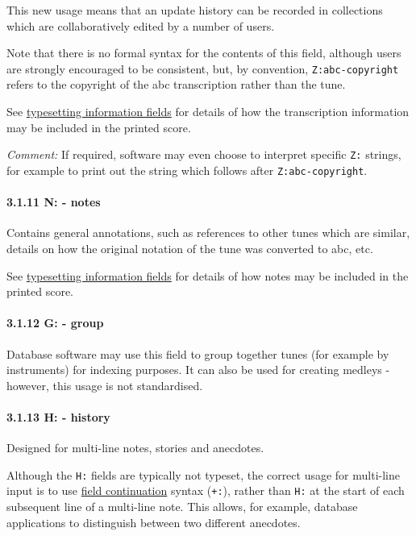 \documentclass[oneside]{book}
\let\oldparagraph\paragraph
\renewcommand{\paragraph}[1]{\oldparagraph{#1}\mbox{}}
\begin{document}
This new usage means that an update history can be recorded in
collections which are collaboratively edited by a number of users.

Note that there is no formal syntax for the contents of this field,
although users are strongly encouraged to be consistent, but, by
convention, \texttt{Z:abc-copyright} refers to the copyright of the abc
transcription rather than the tune.

See \protect\hyperlink{typesetting_information_fields}{typesetting
information fields} for details of how the transcription information may
be included in the printed score.

\emph{Comment:} If required, software may even choose to interpret
specific \texttt{Z:} strings, for example to print out the string which
follows after \texttt{Z:abc-copyright}.

\hypertarget{nnotes}{\paragraph{3.1.11 N: - notes}\label{nnotes}}

Contains general annotations, such as references to other tunes which
are similar, details on how the original notation of the tune was
converted to abc, etc.

See \protect\hyperlink{typesetting_information_fields}{typesetting
information fields} for details of how notes may be included in the
printed score.

\hypertarget{ggroup}{\paragraph{3.1.12 G: - group}\label{ggroup}}

Database software may use this field to group together tunes (for
example by instruments) for indexing purposes. It can also be used for
creating medleys - however, this usage is not standardised.

\hypertarget{hhistory}{\paragraph{3.1.13 H: - history}\label{hhistory}}

Designed for multi-line notes, stories and anecdotes.

Although the \texttt{H:} fields are typically not typeset, the correct
usage for multi-line input is to use
\protect\hyperlink{field_continuation}{field continuation} syntax
(\texttt{+:}), rather than \texttt{H:} at the start of each subsequent
line of a multi-line note. This allows, for example, database
applications to distinguish between two different anecdotes.
\end{document}
